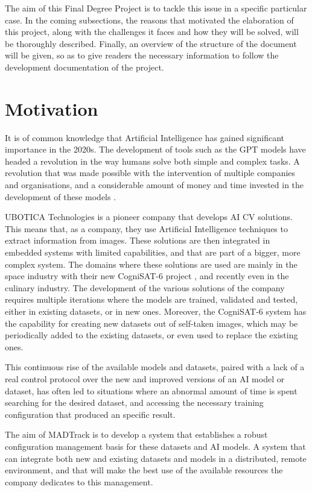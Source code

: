 The aim of this Final Degree Project is to tackle this issue in a specific particular case. In the coming subsections, the reasons that motivated the elaboration
of this project, along with the challenges it faces and how they will be solved, will be thoroughly described. Finally, an overview of the structure of the document
will be given, so as to give readers the necessary information to follow the development documentation of the project.

\section{Motivation}

It is of common knowledge that Artificial Intelligence has gained significant importance in the 2020s. The development of tools such as the GPT models
have headed a revolution in the way humans solve both simple and complex tasks. A revolution that was made possible with the intervention of multiple
companies and organisations, and a considerable amount of money and time invested in the development of these models \cite{AIRise}.

UBOTICA Technologies is a pioneer company that develops \acrshort{AI} \acrfull{CV} solutions. This means that, as a company, they use Artificial Intelligence
techniques to extract information from images. These solutions are then integrated in embedded systems with limited capabilities, and that are part of a 
bigger, more complex system. The domains where these solutions are used are mainly in the space industry with their new CogniSAT-6 project \cite{UBOTICACS6}, 
and recently even in the culinary industry. The development of the various solutions of the company requires multiple iterations where the models are trained,
validated and tested, either in existing datasets, or in new ones. Moreover, the CogniSAT-6 system has the capability for creating new datasets out of self-taken
images, which may be periodically added to the existing datasets, or even used to replace the existing ones.

This continuous rise of the available models and datasets, paired with a lack of a real control protocol over the new and improved versions of an AI model or dataset,
has often led to situations where an abnormal amount of time is spent searching for the desired dataset, and accessing the necessary training configuration
that produced an specific result.

The aim of MADTrack is to develop a system that establishes a robust configuration management basis for these datasets and AI models. A system that can integrate
both new and existing datasets and models in a distributed, remote environment, and that will make the best use of the available resources the company dedicates
to this management.

